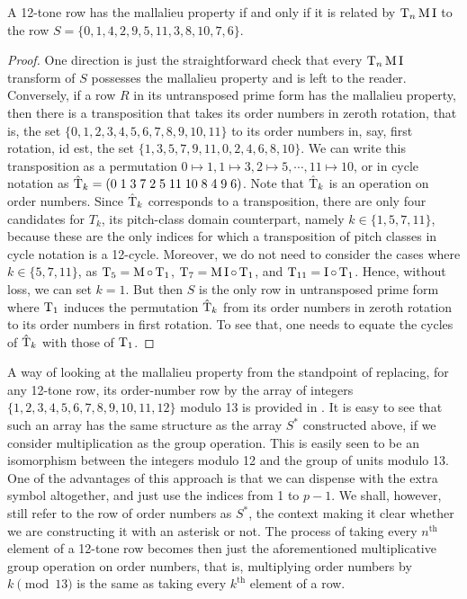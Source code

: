 \begin{proposition}
	\cite[17]{Morris1976}
	\label{morris-mallalieu}
	A 12-tone row has the mallalieu property if and only if it is related by $\operatorname{T}_n\operatorname{M}\operatorname{I}$ to the row $S = \{ 0, 1, 4, 2, 9, 5, 11, 3, 8, 10, 7, 6 \}$.
	\begin{proof}
		One direction is just the straightforward check that every $\operatorname{T}_n\operatorname{M}\operatorname{I}$ transform of $S$ possesses the mallalieu property and is left to the reader. Conversely, if a row $R$ in its untransposed prime form has the mallalieu property, then there is a transposition that takes its order numbers in zeroth rotation, that is, the set $\{ 0, 1, 2, 3, 4, 5, 6, 7, 8, 9, 10, 11 \}$ to its order numbers in, say, first rotation, id est, the set $\{ 1, 3, 5, 7, 9, 11, 0, 2, 4, 6, 8, 10 \}$. We can write this transposition as a permutation $0 \mapsto 1, 1 \mapsto 3, 2 \mapsto 5, \cdots, 11 \mapsto 10 $, or in cycle notation as $\hat{\operatorname{T}}_k = ( 0 \; 1 \; 3 \; 7 \; 2 \; 5 \; 11 \; 10 \; 8 \; 4 \; 9 \; 6 )$. Note that $\hat{\operatorname{T}}_k$ is an operation on order numbers. Since $\hat{\operatorname{T}}_k$ corresponds to a transposition, there are only four candidates for $T_k$, its pitch-class domain counterpart, namely $k \in \{ 1, 5, 7, 11 \}$, because these are the only indices for which a transposition of pitch classes in cycle notation is a 12-cycle. Moreover, we do not need to consider the cases where $k \in \{5, 7, 11\}$, as $\operatorname{T}_5 = \operatorname{M} \circ \operatorname{T}_1$, $\operatorname{T}_7 = \operatorname{M} \operatorname{I} \circ \operatorname{T}_1$, and $\operatorname{T}_{11} = \operatorname{I} \circ \operatorname{T}_1$. Hence, without loss, we can set $k = 1$. But then $S$ is the only row in untransposed prime form where $\operatorname{T}_1$ induces the permutation $\hat{\operatorname{T}}_k$ from its order numbers in zeroth rotation to its order numbers in first rotation. To see that, one needs to equate the cycles of $\hat{\operatorname{T}}_k$ with those of $\operatorname{T}_1$.
	\end{proof}
\end{proposition}

A way of looking at the mallalieu property from the standpoint of replacing, for any 12-tone row, its order-number row by the array of integers $\{ 1, 2, 3, 4, 5, 6, 7, 8, 9, 10, 11, 12 \}$ modulo 13 is provided in \cite[278]{Lewin1966}. It is easy to see that such an array has the same structure as the array $S^*$ constructed above, if we consider multiplication as the group operation. This is easily seen to be an isomorphism between the integers modulo 12 and the group of units modulo 13. One of the advantages of this approach is that we can dispense with the extra symbol altogether, and just use the indices from 1 to $p - 1$. We shall, however, still refer to the row of order numbers as $S^*$, the context making it clear whether we are constructing it with an asterisk or not. The process of taking every $n^\text{th}$ element of a 12-tone row becomes then just the aforementioned multiplicative group operation on order numbers, that is, multiplying order numbers by $k \pmod{13}$ is the same as taking every $k^\text{th}$ element of a row.

